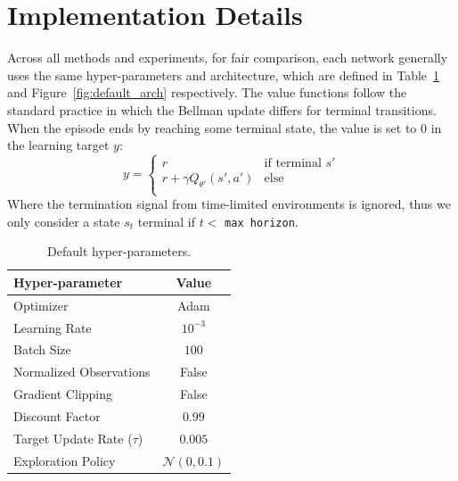 \documentclass{article}
\newcommand{\y}{\gamma}
\newcommand{\N}{\mathcal{N}}
\begin{document}
\section{Implementation Details} \label{appendix:implementation}

Across all methods and experiments, for fair comparison, each network generally uses the same hyper-parameters and architecture, which are defined in Table~\ref{table:default_hp} and Figure~\ref{fig:default_arch} respectively. The value functions follow the standard practice \citep{DQN} in which the Bellman update differs for terminal transitions. When the episode ends by reaching some terminal state, the value is set to $0$ in the learning target $y$: 
\begin{equation}
y = 
  \begin{cases}
  r  & \text{if terminal } s' \\
  r + \y Q_{\theta'}(s',a') & \text{else} \\
  \end{cases}
\end{equation}
Where the termination signal from time-limited environments is ignored, thus we only consider a state $s_t$ terminal if $t < $ \texttt{max horizon}. 

\begin{table}[ht]
\centering
\caption{Default hyper-parameters.} \label{table:default_hp}
\begin{center}
\begin{small}
\begin{tabular}{lc}
\toprule
Hyper-parameter & Value \\
\midrule
Optimizer & Adam \cite{adam} \\
Learning Rate & $10^{-3}$ \\
Batch Size & $100$ \\
Normalized Observations & False \\
Gradient Clipping & False \\
Discount Factor & $0.99$ \\
Target Update Rate ($\tau$) & $0.005$ \\ 
Exploration Policy & $\N(0, 0.1)$ \\ 
\bottomrule
\end{tabular}
\end{small}
\end{center}
\end{table}
\end{document}
